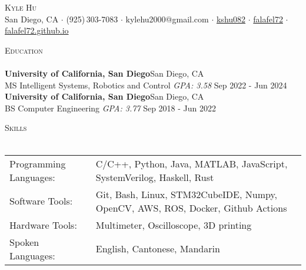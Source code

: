 \documentclass[a4paper]{article}
\newcommand{\lineunder} {
    \vspace*{-8pt} \\
    \hspace*{-18pt} \hrulefill \\
}
\newcommand{\header} [1] {
    {\hspace*{-18pt}\vspace*{6pt} \textsc{#1}}
    \vspace*{-6pt} \lineunder
}
\begin{document}

    

\begin{center}
	{\Huge \scshape {Kyle Hu}}\\
  \vspace{2mm}
	\faGlobe\:San Diego, CA
  $\cdot$ \faPhone\:(925)\,303-7083
  $\cdot$ \faEnvelope\:kylehu2000@gmail.com
  $\cdot$ \faLinkedinSquare\:\href{https://www.linkedin.com/in/kshu082/}{kshu082}
  $\cdot$ \faGithubSquare\:\href{https://www.github.com/falafel72}{falafel72}
  $\cdot$ \faChain\:\href{https://falafel72.github.io}{falafel72.github.io}\\
\end{center}

\begin{comment}
\header{Objective}
Looking for an entry-level full time job where I can fully utilize my
robotics education and systems experience.
\vspace{1mm}
\end{comment}
\header{Education}
\vspace{1mm}
\textbf{University of California, San Diego}\hfill San Diego, CA\\
MS Intelligent Systems, Robotics and Control \textit{GPA: 3.58} \hfill Sep 2022 - Jun 2024\\
\vspace{2mm}
\textbf{University of California, San Diego}\hfill San Diego, CA\\
BS Computer Engineering \textit{GPA: 3.77} \hfill Sep 2018 - Jun 2022\\
\vspace{2mm}

\header{Skills}
\vspace{2mm}
\begin{tabular}{ l l }
	Programming Languages: & C/C++, Python, Java, MATLAB, JavaScript, SystemVerilog, Haskell, Rust  \\
	Software Tools:       & Git, Bash, Linux, STM32CubeIDE, Numpy, OpenCV, AWS, ROS, Docker, Github Actions \\
  Hardware Tools: & Multimeter, Oscilloscope, 3D printing \\
	Spoken Languages:      & English, Cantonese, Mandarin                     \\
\end{tabular}
\vspace{2mm}
\end{document}
